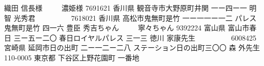 \documentclass[]{jletteraddress}
\begin{document}
\addaddress
     {織田 信長}{様}
     {　　 濃姫}{様}
     {7691621}
     {香川県 観音寺市大野原町井関 一ー四ー一 }
     {}
\addaddress
     {明智 光秀}{君}
     {　　 　　}{}
     {7618021}
     {香川県 高松市鬼無町是竹 一ー一一ー一二}
     {パレス鬼無町是竹 四一六}
\addaddress
     {豊臣 秀吉}{ちゃん}
     {　　 寧々}{ちゃん}
     {9392224}
     {富山県 富山市春日 三ー五ー二〇}
     {春日ロイヤルパレス 三一三}
\addaddress
     {徳川 家康}{先生}
     {　　 　　}{}
     {6008425}
     {宮崎県 延岡市日の出町 二ー一二ー二八}
     {ステーション日の出町三〇〇}
\addaddress
     {森 外}{先生}
     {　 　　}{}
     {110-0005}
     {東京都 下谷区上野花園町 一番地 }
     {}
\end{document}
